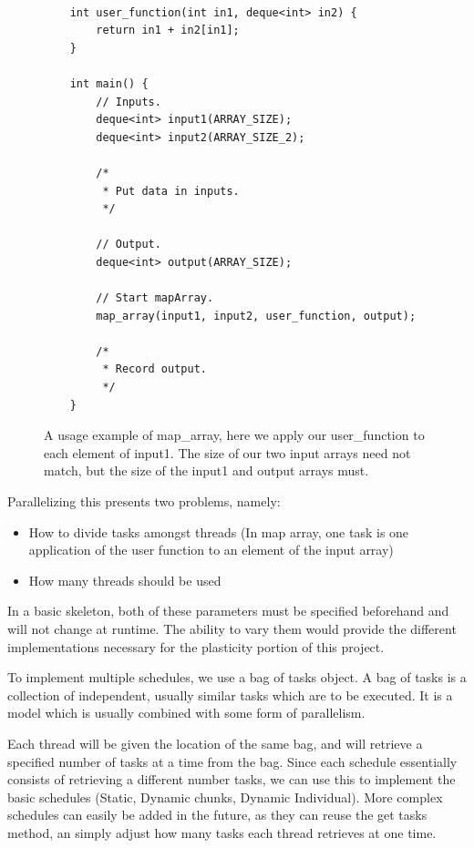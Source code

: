 \begin{figure}
	\begin{lstlisting}

	int user_function(int in1, deque<int> in2) {
		return in1 + in2[in1];
	}

	int main() {
		// Inputs.
		deque<int> input1(ARRAY_SIZE);
		deque<int> input2(ARRAY_SIZE_2);

		/*
		 * Put data in inputs.
		 */

		// Output.
		deque<int> output(ARRAY_SIZE);

		// Start mapArray.
		map_array(input1, input2, user_function, output);

		/*
		 * Record output.
		 */
	}

	\end{lstlisting}

	\caption{A usage example of map\_array, here we apply our user\_function to each element of input1. The size of our two input arrays need not match, but the size of the input1 and output arrays must.}
	\label{fig:map_array_usage_example}
\end{figure}



\begin{minipage}{\textwidth}

Parallelizing this presents two problems, namely:

\begin{itemize}
	\item How to divide tasks amongst threads (In map array, one task is one application of the user function to an element of the input array)
	\item How many threads should be used
\end{itemize}

\end{minipage}
 
In a basic skeleton, both of these parameters must be specified beforehand and will not change at runtime. The ability to vary them would provide the different implementations necessary for the plasticity portion of this project.

To implement multiple schedules, we use a bag of tasks object. A bag of tasks is a collection of independent, usually similar tasks which are to be executed. It is a model which is usually combined with some form of parallelism.

Each thread will be given the location of the same bag, and will retrieve a specified number of tasks at a time from the bag. Since each schedule essentially consists of retrieving a different number tasks, we can use this to implement the basic schedules (Static, Dynamic chunks, Dynamic Individual). More complex schedules can easily be added in the future, as they can reuse the get tasks method, an simply adjust how many tasks each thread retrieves at one time.

